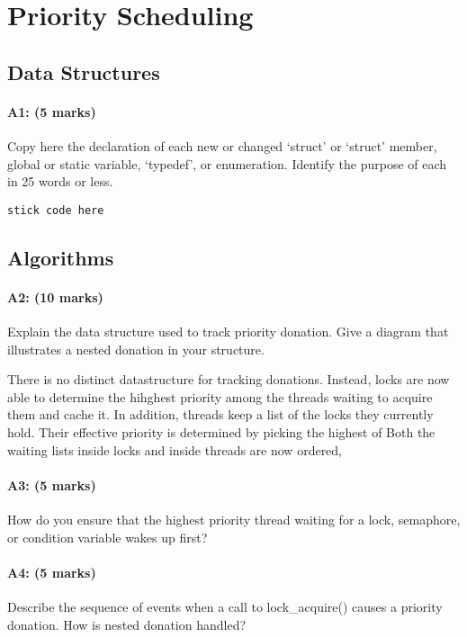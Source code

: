 \section{Priority Scheduling}
\subsection{Data Structures}
\paragraph{A1: (5 marks)}
Copy here the declaration of each new or changed `struct' or `struct' member, global or static variable, `typedef', or enumeration.  Identify the purpose of each in 25 words or less.

\begin{verbatim}
stick code here
\end{verbatim}

\subsection{Algorithms}
\paragraph{A2: (10 marks)}
Explain the data structure used to track priority donation. Give a diagram that illustrates a nested donation in your structure.

There is no distinct datastructure for tracking donations.
Instead, locks are now able to determine the hihghest priority among the threads waiting to acquire them and cache it.
In addition, threads keep a list of the locks they currently hold. Their effective priority is determined by picking the highest of 
Both the waiting lists inside locks and inside threads are now ordered, 

\paragraph{A3: (5 marks)}
How do you ensure that the highest priority thread waiting for a lock, semaphore, or condition variable wakes up first?

\paragraph{A4: (5 marks)}
Describe the sequence of events when a call to lock\_acquire() causes a priority donation.  How is nested donation handled?

